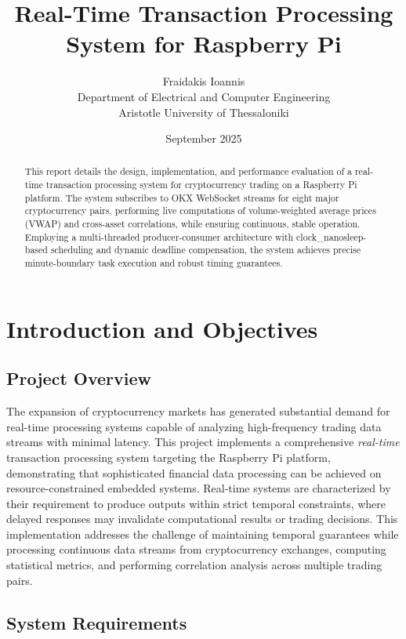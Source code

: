 \documentclass[12pt,a4paper]{article}
\title{\huge \textbf{Real-Time Transaction Processing System for Raspberry Pi}}
\author{Fraidakis Ioannis\\
\small Department of Electrical and Computer Engineering\\
\small Aristotle University of Thessaloniki}
\date{September 2025}
\begin{document}
\maketitle

\begin{abstract}
This report details the design, implementation, and performance evaluation of a real-time transaction processing system for cryptocurrency trading on a Raspberry Pi platform. The system subscribes to OKX WebSocket streams for eight major cryptocurrency pairs, performing live computations of volume-weighted average prices (VWAP) and cross-asset correlations, while ensuring continuous, stable operation. Employing a multi-threaded producer-consumer architecture with clock\_nanosleep-based scheduling and dynamic deadline compensation, the system achieves precise minute-boundary task execution and robust timing guarantees.
\end{abstract}

\vspace{3mm}

\section{Introduction and Objectives}

\subsection{Project Overview}

The expansion of cryptocurrency markets has generated substantial demand for real-time processing systems capable of analyzing high-frequency trading data streams with minimal latency. This project implements a comprehensive \emph{real-time} transaction processing system targeting the Raspberry Pi platform, demonstrating that sophisticated financial data processing can be achieved on resource-constrained embedded systems. Real-time systems are characterized by their requirement to produce outputs within strict temporal constraints, where delayed responses may invalidate computational results or trading decisions. This implementation addresses the challenge of maintaining temporal guarantees while processing continuous data streams from cryptocurrency exchanges, computing statistical metrics, and performing correlation analysis across multiple trading pairs.


\subsection{System Requirements}
\end{document}
